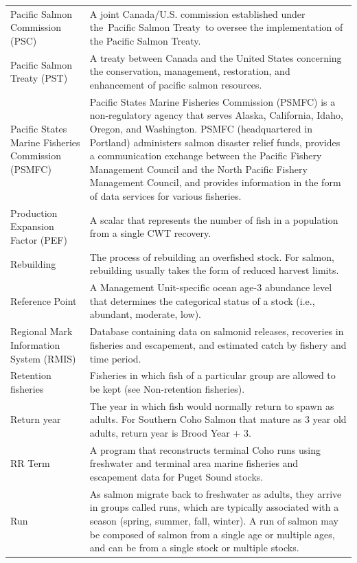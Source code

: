 \documentclass[
  letterpaper,
  DIV=11,
  numbers=noendperiod]{scrartcl}
\begin{document}
\begin{table}
\begin{tabular*}{\linewidth}{@{\extracolsep{\fill}}ll}
Pacific Salmon Commission (PSC) & A joint Canada/U.S. commission established under the Pacific Salmon Treaty to oversee the implementation of the Pacific Salmon Treaty. \\ 
Pacific Salmon Treaty (PST) & A treaty between Canada and the United States concerning the conservation, management, restoration, and enhancement of pacific salmon resources. \\ 
Pacific States Marine Fisheries Commission  (PSMFC) & Pacific States Marine Fisheries Commission (PSMFC) is a non‐regulatory agency that serves Alaska, California, Idaho, Oregon, and Washington. PSMFC (headquartered in Portland) administers salmon disaster relief funds, provides a communication exchange between the Pacific Fishery Management Council and the North Pacific Fishery Management Council, and provides information in the form of data services for various fisheries. \\ 
Production Expansion Factor (PEF) & A scalar that represents the number of fish in a population from a single CWT recovery. \\ 
Rebuilding & The process of rebuilding an overfished stock. For salmon, rebuilding usually takes the form of reduced harvest limits. \\ 
Reference Point & A Management Unit-specific ocean age-3 abundance level that determines the categorical status of a stock (i.e., abundant, moderate, low). \\ 
Regional Mark Information System (RMIS) & Database containing data on salmonid releases, recoveries in fisheries and escapement, and estimated catch by fishery and time period. \\ 
Retention fisheries & Fisheries in which fish of a particular group are allowed to be kept (see Non-retention fisheries). \\ 
Return year & The year in which fish would normally return to spawn as adults. For Southern Coho Salmon that mature as 3 year old adults, return year is Brood Year + 3. \\ 
RR Term & A program that reconstructs terminal Coho runs using freshwater and terminal area marine fisheries and escapement data for Puget Sound stocks. \\ 
Run & As salmon migrate back to freshwater as adults, they arrive in groups called runs, which are typically associated with a season (spring, summer, fall, winter). A run of salmon may be composed of salmon from a single age or multiple ages, and can be from a single stock or multiple stocks. \\ 

\end{tabular*}
\end{table}
\end{document}
